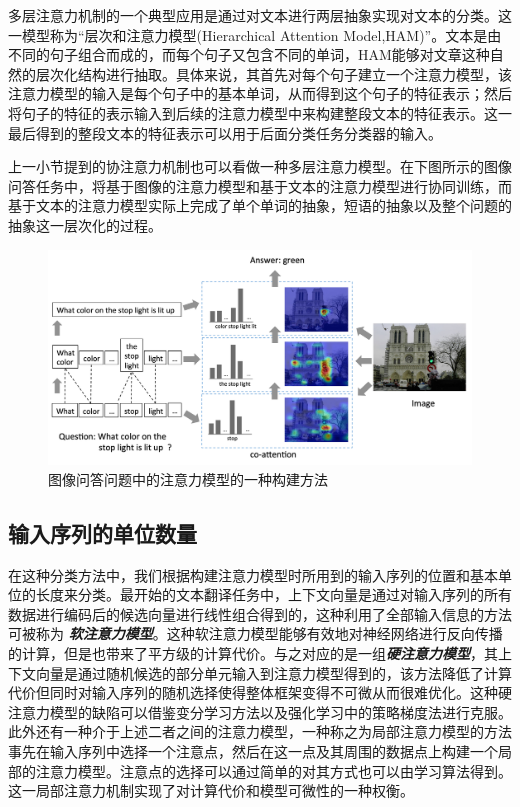 \documentclass{ctexart}
\begin{document}
多层注意力机制的一个典型应用是通过对文本进行两层抽象实现对文本的分类。这一模型称为“层次和注意力模型(Hierarchical Attention Model,HAM)”。文本是由不同的句子组合而成的，而每个句子又包含不同的单词，HAM能够对文章这种自然的层次化结构进行抽取。具体来说，其首先对每个句子建立一个注意力模型，该注意力模型的输入是每个句子中的基本单词，从而得到这个句子的特征表示；然后将句子的特征的表示输入到后续的注意力模型中来构建整段文本的特征表示。这一最后得到的整段文本的特征表示可以用于后面分类任务分类器的输入。


上一小节提到的协注意力机制也可以看做一种多层注意力模型。在下图所示的图像问答任务中，将基于图像的注意力模型和基于文本的注意力模型进行协同训练，而基于文本的注意力模型实际上完成了单个单词的抽象，短语的抽象以及整个问题的抽象这一层次化的过程。
\begin{figure}[htb!]
	\centering
	\includegraphics[scale=0.4]{co-multi.png}
	\caption{图像问答问题中的注意力模型的一种构建方法}
\end{figure}
\subsection{输入序列的单位数量}
在这种分类方法中，我们根据构建注意力模型时所用到的输入序列的位置和基本单位的长度来分类。最开始的文本翻译任务中，上下文向量是通过对输入序列的所有数据进行编码后的候选向量进行线性组合得到的，这种利用了全部输入信息的方法可被称为
\textit{\textbf{软注意力模型}}。这种软注意力模型能够有效地对神经网络进行反向传播的计算，但是也带来了平方级的计算代价。与之对应的是一组\textit{\textbf{硬注意力模型}}，其上下文向量是通过随机候选的部分单元输入到注意力模型得到的，该方法降低了计算代价但同时对输入序列的随机选择使得整体框架变得不可微从而很难优化。这种硬注意力模型的缺陷可以借鉴变分学习方法以及强化学习中的策略梯度法进行克服。此外还有一种介于上述二者之间的注意力模型，一种称之为局部注意力模型的方法事先在输入序列中选择一个注意点，然后在这一点及其周围的数据点上构建一个局部的注意力模型。注意点的选择可以通过简单的对其方式也可以由学习算法得到。这一局部注意力机制实现了对计算代价和模型可微性的一种权衡。
\end{document}
